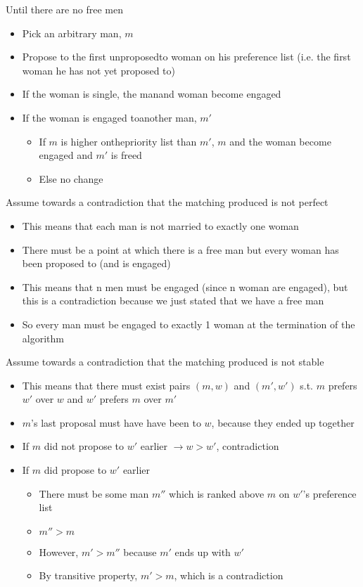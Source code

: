 \algorithm
{
    \item Until there are no free men
    \begin{itemize}
        \item Pick an arbitrary man, $m$
        \item Propose to the first unproposedto woman on his preference list (i.e. the first woman he has not yet proposed to)
        \item If the woman is single, the manand woman become engaged
        \item If the woman is engaged toanother man, $m'$
        \begin {itemize}
            \item If $m$ is higher onthepriority list than $m'$, $m$ and the woman become engaged and $m'$ is freed
            \item Else no change
        \end{itemize}
    \end{itemize}
}
{
    \item Assume towards a contradiction that the matching produced is not perfect
    \begin{itemize}
        \item This means that each man is not married to exactly one woman
        \item There must be a point at which there is a free man but every woman has been proposed to (and is engaged)
        \item This means that n men must be engaged (since n woman are engaged), but this is a contradiction because we just stated that we have a free man
        \item So every man must be engaged to exactly 1 woman at the termination of the algorithm
    \end{itemize}
    \item Assume towards a contradiction that the matching produced is not stable
    \begin{itemize}
        \item This means that there must exist pairs $(m, w)$ and $(m', w')$ s.t. $m$ prefers $w'$ over $w$ and $w'$ prefers $m$ over $m'$
        \item $m$'s last proposal must have have been to $w$, because they ended up together
        \item If $m$ did not propose to $w'$ earlier $\rightarrow w > w'$, contradiction 
        \item If $m$ did propose to $w'$ earlier
        \begin{itemize}
            \item There must be some man $m''$ which is ranked above $m$ on $w'$'s preference list
            \item $m'' > m$
            \item However, $m' > m''$ because $m'$ ends up with $w'$
            \item By transitive property, $m' >m$, which is a contradiction
        \end{itemize}
    \end{itemize}
}
